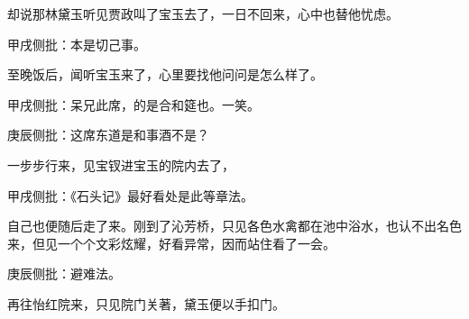 \begin{parag}
    却说那林黛玉听见贾政叫了宝玉去了，一日不回来，心中也替他忧虑。\begin{note}甲戌侧批：本是切己事。\end{note}至晚饭后，闻听宝玉来了，心里要找他问问是怎么样了。\begin{note}甲戌侧批：呆兄此席，的是合和筵也。一笑。\end{note}\begin{note}庚辰侧批：这席东道是和事酒不是？\end{note}一步步行来，见宝钗进宝玉的院内去了，\begin{note}甲戌侧批：《石头记》最好看处是此等章法。\end{note}自己也便随后走了来。刚到了沁芳桥，只见各色水禽都在池中浴水，也认不出名色来，但见一个个文彩炫耀，好看异常，因而站住看了一会。\begin{note}庚辰侧批：避难法。\end{note}再往怡红院来，只见院门关著，黛玉便以手扣门。
\end{parag}


